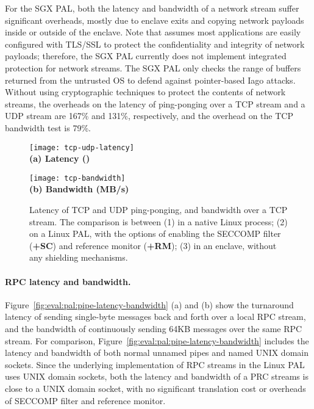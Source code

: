 For the SGX PAL, both the latency and bandwidth of a network stream suffer significant overheads, mostly due to enclave exits and copying network payloads inside or outside of the enclave. Note that \graphenesgx{} assumes most applications are easily configured with TLS/SSL to protect the confidentiality and integrity of network payloads; therefore, the SGX PAL currently does not implement integrated protection for network streams. The SGX PAL only checks the range of buffers
returned from the untrusted OS
to defend against pointer-based Iago attacks.
Without using cryptographic techniques to protect the contents of network streams, the overheads on the latency of ping-ponging over a TCP stream and a UDP stream are \roughly{}167\% and \roughly{}131\%, respectively, and the overhead on the TCP bandwidth test is \roughly{}79\%. 

\begin{figure*}[t!]
\centering
\footnotesize
\begin{minipage}{.56\linewidth}
\centering
\texttt{[image: tcp-udp-latency]}\\
{\bf (a) Latency (\usec{})}
\vspace{6pt}
\end{minipage}
\begin{minipage}{.42\linewidth}
\centering
\texttt{[image: tcp-bandwidth]}\\
{\bf (b) Bandwidth (MB/s)}
\vspace{6pt}
\end{minipage}
\caption{Latency of TCP and UDP ping-ponging, and bandwidth over a TCP stream.
The comparison is between (1) \linuxapis{} in a native Linux process; (2) \hostapis{} on a Linux PAL, with the options of enabling the SECCOMP filter ({\bf +SC}) and reference monitor ({\bf +RM}); (3) \hostapis{} in an enclave, without any shielding mechanisms.}
\label{fig:eval:pal:network-latency-bandwidth}
\end{figure*}




\paragraph{RPC latency and bandwidth.}
Figure~\ref{fig:eval:pal:pipe-latency-bandwidth} (a) and (b) show
the turnaround latency of sending single-byte messages back and forth over a local RPC stream, and the bandwidth of continuously sending 64KB messages over the same RPC stream.
For comparison, Figure~\ref{fig:eval:pal:pipe-latency-bandwidth} includes the latency and bandwidth of both normal unnamed pipes and named UNIX domain sockets.
Since the underlying implementation of RPC streams in the Linux PAL
uses UNIX domain sockets,
both the latency and bandwidth of a PRC streams
is close to a UNIX domain socket, with no significant translation cost or overheads of SECCOMP filter and reference monitor.


